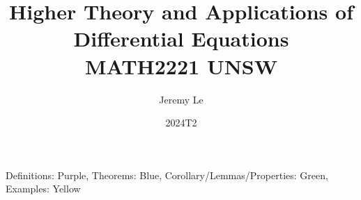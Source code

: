 \documentclass[12pt, letterpaper]{article}
\title{Higher Theory and Applications of Differential Equations \\ MATH2221 UNSW}
\author{Jeremy Le}
\date{2024T2}
\begin{document}
\maketitle

Definitions: Purple, Theorems: Blue, Corollary/Lemmas/Properties: Green, Examples: Yellow
\tableofcontents
\newpage
\end{document}
